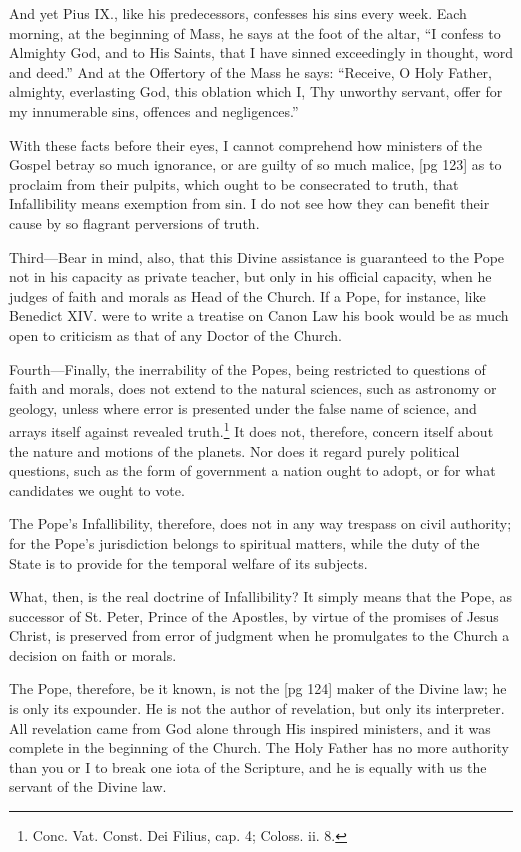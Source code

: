 And yet Pius IX., like his predecessors, confesses
his sins every week. Each morning, at the
beginning of Mass, he says at the foot of the altar,
“I confess to Almighty God, and to His Saints,
that I have sinned exceedingly in thought, word
and deed.” And at the Offertory of the Mass
he says: “Receive, O Holy Father, almighty,
everlasting God, this oblation which I, Thy unworthy
servant, offer for my innumerable sins,
offences and negligences.”

With these facts before their eyes, I cannot
comprehend how ministers of the Gospel betray
so much ignorance, or are guilty of so much malice,
[pg 123]
as to proclaim from their pulpits, which ought to
be consecrated to truth, that Infallibility means
exemption from sin. I do not see how they can
benefit their cause by so flagrant perversions of
truth.

Third—Bear in mind, also, that this Divine assistance
is guaranteed to the Pope not in his capacity
as private teacher, but only in his official
capacity, when he judges of faith and morals as
Head of the Church. If a Pope, for instance, like
Benedict XIV. were to write a treatise on Canon
Law his book would be as much open to criticism
as that of any Doctor of the Church.

Fourth—Finally, the inerrability of the Popes,
being restricted to questions of faith and morals,
does not extend to the natural sciences, such as
astronomy or geology, unless where error is presented
under the false name of science, and arrays
itself against revealed truth.\footnote{Conc.
Vat. Const. Dei Filius, cap. 4;
Coloss. ii. 8.} It does not,
therefore, concern itself about the nature and motions
of the planets. Nor does it regard purely
political questions, such as the form of government
a nation ought to adopt, or for what candidates
we ought to vote.

The Pope's Infallibility, therefore, does not in
any way trespass on civil authority; for the
Pope's jurisdiction belongs to spiritual matters,
while the duty of the State is to provide for the
temporal welfare of its subjects.

What, then, is the real doctrine of Infallibility?
It simply means that the Pope, as successor of
St. Peter, Prince of the Apostles, by virtue of
the promises of Jesus Christ, is preserved from
error of judgment when he promulgates to the
Church a decision on faith or morals.

The Pope, therefore, be it known, is not the
[pg 124]
maker of the Divine law; he is only its expounder.
He is not the author of revelation, but only its interpreter.
All revelation came from God alone
through His inspired ministers, and it was complete
in the beginning of the Church. The Holy
Father has no more authority than you or I to
break one iota of the Scripture, and he is equally
with us the servant of the Divine law.

